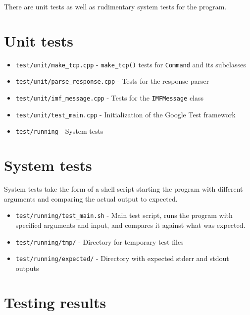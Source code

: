 \documentclass[a4]{report}
\begin{document}
There are unit tests as well as rudimentary system tests for the program.

\section{Unit tests}

\begin{itemize}
\item \texttt{test/unit/make\_tcp.cpp} - \texttt{make\_tcp()} tests for \texttt{Command} and its subclasses
\item \texttt{test/unit/parse\_response.cpp} - Tests for the response parser
\item \texttt{test/unit/imf\_message.cpp} - Tests for the \texttt{IMFMessage} class
\item \texttt{test/unit/test\_main.cpp} - Initialization of the Google Test framework
\item \texttt{test/running} - System tests
\end{itemize}

\section{System tests}

System tests take the form of a shell script starting the program with different arguments and comparing the actual output to expected.

\begin{itemize}
\item \texttt{test/running/test\_main.sh} - Main test script, runs the program with specified arguments and input, and compares it against what was expected.
\item \texttt{test/running/tmp/} - Directory for temporary test files
\item \texttt{test/running/expected/} - Directory with expected stderr and stdout outputs
\end{itemize}

\section{Testing results}
\end{document}
